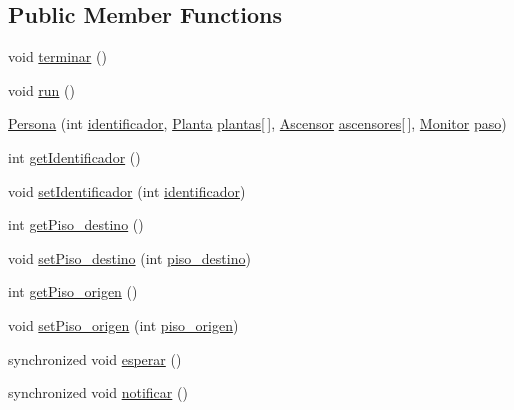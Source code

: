 \subsection*{Public Member Functions}
\begin{DoxyCompactItemize}
\item 
void \mbox{\hyperlink{classpecl6part1_1_1_persona_aa12dc3804209c0efb920b2fda7d1fbbd}{terminar}} ()
\item 
void \mbox{\hyperlink{classpecl6part1_1_1_persona_ad51df606a3a8ed3e880c3405209ae188}{run}} ()
\item 
\mbox{\hyperlink{classpecl6part1_1_1_persona_a81592bc70d6788bd895eda5b5d42a250}{Persona}} (int \mbox{\hyperlink{classpecl6part1_1_1_persona_a21697d6304f8709b939317b63daccdcc}{identificador}}, \mbox{\hyperlink{classpecl6part1_1_1_planta}{Planta}} \mbox{\hyperlink{classpecl6part1_1_1_persona_aa5841c74449c09b7aa8e0c646365228d}{plantas}}\mbox{[}$\,$\mbox{]}, \mbox{\hyperlink{classpecl6part1_1_1_ascensor}{Ascensor}} \mbox{\hyperlink{classpecl6part1_1_1_persona_a4a61953407b3ad73a3dfcc9314f36d73}{ascensores}}\mbox{[}$\,$\mbox{]}, \mbox{\hyperlink{classpecl6part1_1_1_monitor}{Monitor}} \mbox{\hyperlink{classpecl6part1_1_1_persona_a5bad8cf9009a1412b98f0585761ba19a}{paso}})
\item 
int \mbox{\hyperlink{classpecl6part1_1_1_persona_a9a0fb957aa211a3d4afbe65250a70a82}{get\+Identificador}} ()
\item 
void \mbox{\hyperlink{classpecl6part1_1_1_persona_a7d2c417c463fe236125b25104de2c079}{set\+Identificador}} (int \mbox{\hyperlink{classpecl6part1_1_1_persona_a21697d6304f8709b939317b63daccdcc}{identificador}})
\item 
int \mbox{\hyperlink{classpecl6part1_1_1_persona_a82e55b6a597ab6cc0aa1d8fcfed9164b}{get\+Piso\+\_\+destino}} ()
\item 
void \mbox{\hyperlink{classpecl6part1_1_1_persona_a0449c51124b199b8a5b203aeff1385bc}{set\+Piso\+\_\+destino}} (int \mbox{\hyperlink{classpecl6part1_1_1_persona_a2601b87adc4d07c03478b8a5dec4289e}{piso\+\_\+destino}})
\item 
int \mbox{\hyperlink{classpecl6part1_1_1_persona_a0d9f25e9600c220763f05428a268c3d9}{get\+Piso\+\_\+origen}} ()
\item 
void \mbox{\hyperlink{classpecl6part1_1_1_persona_ac19fce12d96824b60a212e38bc532cf3}{set\+Piso\+\_\+origen}} (int \mbox{\hyperlink{classpecl6part1_1_1_persona_a6a8187e7b1c423eb263a336a573d634f}{piso\+\_\+origen}})
\item 
synchronized void \mbox{\hyperlink{classpecl6part1_1_1_persona_a1ee95a7bcb4b3cfe808d39c6db8dcc06}{esperar}} ()
\item 
synchronized void \mbox{\hyperlink{classpecl6part1_1_1_persona_a46859003cc6e2579a8f78d4c216a1082}{notificar}} ()
\end{DoxyCompactItemize}
